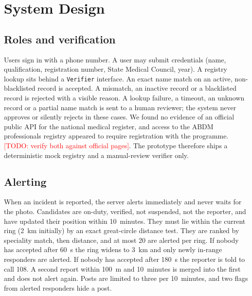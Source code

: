 \documentclass[conference]{IEEEtran}
\newcommand{\todo}[1]{\textcolor{red}{[TODO: #1]}}
\begin{document}
\section{System Design}
\subsection{Roles and verification}
Users sign in with a phone number. A user may submit credentials (name, qualification, registration number, State Medical Council, year). A registry lookup sits behind a \texttt{Verifier} interface. An exact name match on an active, non-blacklisted record is accepted. A mismatch, an inactive record or a blacklisted record is rejected with a visible reason. A lookup failure, a timeout, an unknown record or a partial name match is sent to a human reviewer; the system never approves or silently rejects in these cases. We found no evidence of an official public API for the national medical register, and access to the ABDM professionals registry appeared to require registration with the programme. \todo{verify both against official pages}. The prototype therefore ships a deterministic mock registry and a manual-review verifier only.

\subsection{Alerting}
When an incident is reported, the server alerts immediately and never waits for the photo. Candidates are on-duty, verified, not suspended, not the reporter, and have updated their position within 10~minutes. They must lie within the current ring (2~km initially) by an exact great-circle distance test. They are ranked by speciality match, then distance, and at most 20 are alerted per ring. If nobody has accepted after 60~s the ring widens to 3~km and only newly in-range responders are alerted. If nobody has accepted after 180~s the reporter is told to call 108. A second report within 100~m and 10~minutes is merged into the first and does not alert again. Posts are limited to three per 10~minutes, and two flags from alerted responders hide a post.
\end{document}
